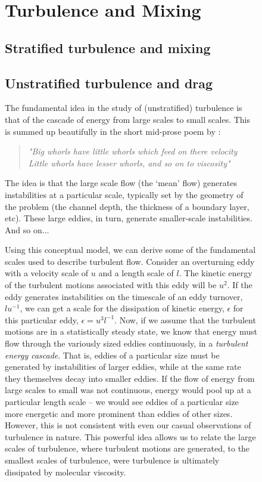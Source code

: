 \documentclass[11pt]{report}
\numberwithin{equation}{section}
\begin{document}
\begin{figure}
\chapter{Turbulence and Mixing}
\label{chapter:turbulence}

\section{Stratified turbulence and mixing}

\section{Unstratified turbulence and drag}

The fundamental idea in the study of (unstratified) turbulence is that of the cascade of energy from large scales to small scales.  This is summed up beautifully in the short mid-prose poem by \citet[][page 66]{richardson:22}:
\begin{quote}
{\itshape "Big whorls have little whorls which feed on there velocity\\
       Little whorls have lesser whorls, and so on to viscosity"}
\end{quote}
The idea is that the large scale flow (the `mean' flow) generates instabilities at a particular scale, typically set by the geometry of the problem (the channel depth, the thickness of a boundary layer, etc).  These large eddies, in turn, generate smaller-scale instabilities.  And so on...

Using this conceptual model, we can derive some of the fundamental scales used to describe turbulent flow.  Consider an overturning eddy with a velocity scale of $u$ and a length scale of $l$.  The kinetic energy of the turbulent motions associated with this eddy will be $u^2$.  If the eddy generates instabilities on the timescale of an eddy turnover, $l u^{-1}$, we can get a scale for the dissipation of kinetic energy, $\epsilon$ for this particular eddy, $\epsilon = u^3 l^{-1}$.  Now, if we assume that the turbulent motions are in a statistically steady state, we know that energy must flow through the variously sized eddies continuously, in a \emph{turbulent energy cascade}.  That is, eddies of a particular size must be generated by instabilities of larger eddies, while at the same rate they themselves decay into smaller eddies.  If the flow of energy from large scales to small was not continuous, energy would pool up at a particular length scale -- we would see eddies of a particular size more energetic and more prominent than eddies of other sizes.  However, this is not consistent with even our casual observations of turbulence in nature.  This powerful idea allows us to relate the large scales of turbulence, where turbulent motions are generated, to the smallest scales of turbulence, were turbulence is ultimately dissipated by molecular viscosity.


\end{figure}
\end{document}
